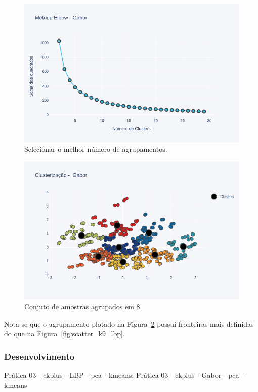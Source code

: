 \documentclass[a4paper, 12 pt, conference]{ieeeconf}  %
\begin{document}
\begin{figure}[!htbp]
	\centering
	\includegraphics[width=1.0\linewidth,clip=true,trim=0cm 0cm 0cm 0cm, keepaspectratio=true]{points_elbow_gabor.png}
	\caption{Selecionar o melhor número de agrupamentos.}
	\label{fig:points_elbow_gabor}
\end{figure}

\begin{figure}[!htbp]
	\centering
	\includegraphics[width=1.0\linewidth,clip=true,trim=0cm 0cm 0cm 0cm, keepaspectratio=true]{scatter_k8_gabor.png}
	\caption{Conjuto de amostras agrupados em 8.}
	\label{fig:scatter_k8_gabor}
\end{figure}

Nota-se que o agrupamento plotado na Figura~\ref{fig:scatter_k8_gabor} possui fronteiras mais definidas do que na Figura~\ref{fig:scatter_k9_lbp}.

\subsubsection{Desenvolvimento} Prática 03 - ckplus - LBP - pca - kmeans; Prática 03 - ckplus - Gabor - pca - kmeans
\end{document}
